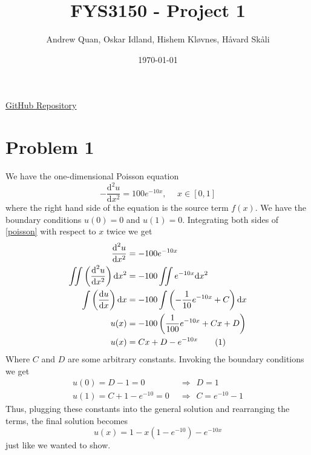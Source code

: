 \documentclass[english,notitlepage]{revtex4-1}  %
\newcommand{\imp}{\hspace{5pt}\Rightarrow\hspace{5pt}}
\newcommand\numberthis{\addtocounter{equation}{1}\tag{\theequation}}
\begin{document}
\title{\textbf{FYS3150 - Project 1}}
\author{Andrew Quan, Oskar Idland, Hishem Kløvnes, Håvard Skåli}
\date{\today}                             %
\noaffiliation      




\maketitle 
    
\href{https://github.com/Oskar-Idland/FYS3150-ComputationalPhysic}{GitHub Repository}
    
\section*{Problem 1}
We have the one-dimensional Poisson equation
\begin{equation}
    -\frac{\text{d}^2 u}{\text{d}x^2} = 100e^{-10x}, \hspace{15pt} x \in [0,1] \label{poisson}
\end{equation}
where the right hand side of the equation is the source term $f(x)$. We have the boundary conditions $u(0) = 0$ and $u(1) = 0$. Integrating both sides of \eqref{poisson} with respect to $x$ twice we get
\begin{align*}
    \frac{\text{d}^2 u}{\text{d}x^2} &= -100e^{-10x} \\
    \iint \left( \frac{\text{d}^2 u}{\text{d}x^2} \right) \text{d}x^2 &= -100\iint e^{-10x} \text{d}x^2 \\
    \int \left( \frac{\text{d}u}{\text{d}x}\right) \text{d}x &= -100\int \left(-\frac{1}{10}e^{-10x} + C\right)\text{d}x \\
    u(x) &= -100\left(\frac{1}{100}e^{-10x} + Cx + D\right) \\
    u(x) &= Cx + D - e^{-10x} \numberthis \label{general sol}
\end{align*}
Where $C$ and $D$ are some arbitrary constants. Invoking the boundary conditions we get
\begin{align*}
    u(0) = D - 1 = 0 &\imp D = 1 \\
    u(1) = C + 1 - e^{-10} = 0 &\imp C = e^{-10} - 1
\end{align*}
Thus, plugging these constants into the general solution and rearranging the terms, the final solution becomes
\begin{equation}
    u(x) = 1 - x\left(1 - e^{-10}\right) - e^{-10x} \label{final sol}
\end{equation}
just like we wanted to show.
\end{document}
